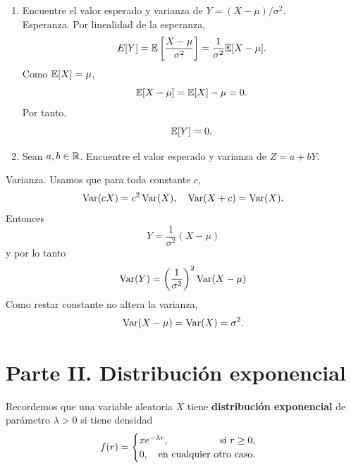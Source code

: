 \documentclass[12pt,a4paper]{article}
\newcommand{\paren}[1]{\left( #1 \right)}
\begin{document}
    \begin{solucion}
        \begin{enumerate}
            \item[(a)] Encuentre el valor esperado y varianza de $Y=(X-\mu)/\sigma^{2}$.\\
            Esperanza. Por linealidad de la esperanza,
            \begin{equation*}
                E[Y]=\mathbb{E}\left[\frac{X-\mu}{\sigma^{2}}\right]=\frac{1}{\sigma^{2}}\mathbb{E}[X-\mu].
            \end{equation*}
            Como $\mathbb{E}[X]=\mu$,
            \begin{equation*}
                \mathbb{E}[X-\mu]=\mathbb{E}[X]-\mu=0.
            \end{equation*}
            Por tanto,
            \begin{equation*}
                \mathbb{E}[Y]=0.
            \end{equation*}
            \item[(b)] Sean $a,b\in\mathbb{R}$. Encuentre el valor esperado y varianza de $Z=a+bY$.
        \end{enumerate}
        Varianza. Usamos que para toda constante $c$,
        \begin{equation*}
            \operatorname{Var}(cX)=c^{2}\operatorname{Var}(X),\quad \operatorname{Var}(X+c)=\operatorname{Var}(X).
        \end{equation*}
        Entonces
        \begin{equation*}
            Y=\frac{1}{\sigma^{2}}(X-\mu)
        \end{equation*}
        y por lo tanto
        \begin{equation*}
            \Var(Y)=\paren{\frac{1}{\sigma^{2}}}^{2}\Var(X-\mu)
        \end{equation*}
        Como restar constante no altera la varianza,
        \begin{equation*}
            \operatorname{Var}(X-\mu)=\operatorname{Var}(X)=\sigma^{2}.
        \end{equation*}
    \end{solucion}

    \section*{Parte II. Distribución exponencial}

    Recordemos que una variable aleatoria $X$ tiene \textbf{distribución exponencial} de parámetro $\lambda\gt0$ si tiene densidad
    \begin{equation*}
        f(r)=
        \begin{cases}
            xe^{-\lambda r},\hfill\quad\text{si }r\geq0,\\
            0,\hfill\quad\text{en cualquier otro caso}.
        \end{cases}
    \end{equation*}
\end{document}
